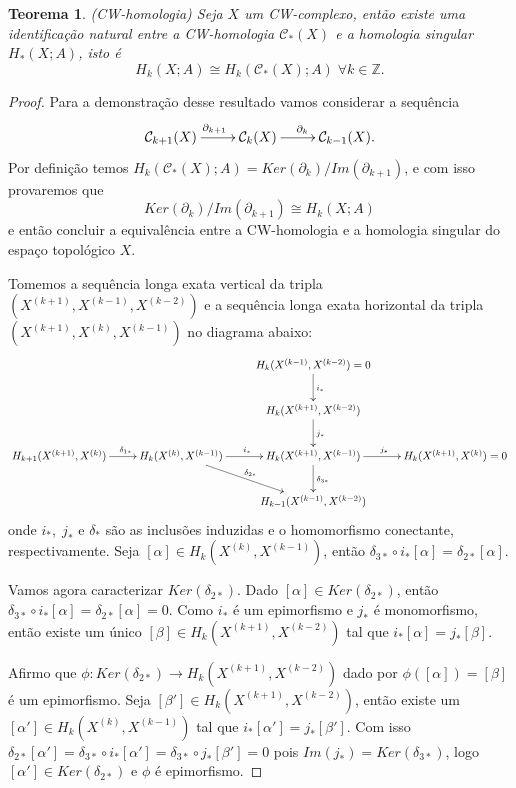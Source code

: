 \documentclass[12pt]{book}
\newtheorem{teorema}{Teorema}[section]
\newcommand{\classe}[1]{[#1]}
\newcommand{\homologia}[2]{H_{#1}(#2;A)}
\newcommand{\homologiarelskele}[3]{H_{#1}(X^{(#2)}, X^{(#3)})}
\newcommand{\homologiarelskelesimpl}[2]{H_{#1}(X^{(#2)}, X^{(#2-1)})}
\newcommand{\inteiros}{\mathbb{Z}}
\newcommand{\skeleton}[1]{X^{(#1)}}
\begin{document}
	\begin{teorema}\label{teorema_cw_homologia}
		(CW-homologia) Seja $X$ um CW-complexo, então existe uma identificação natural entre a CW-homologia $\mathcal{C}_{*}(X)$ e a homologia singular $\homologia{*}{X}$, isto é 
		$$
		\homologia{k}{X} \cong \homologia{k}{\mathcal{C}_{*}(X)}\; \forall k \in \inteiros.
		$$
	\end{teorema}
	\begin{proof}
		Para a demonstração desse resultado vamos considerar a sequência 
		$$
		\xymatrix{
			\mathcal{C}_{k+1}(X) \ar[r]^{\partial_{k+1}} & \mathcal{C}_{k}(X) \ar[r]^{\partial_{k}} & \mathcal{C}_{k-1}(X).
		}
		$$
		Por definição temos $\homologia{k}{\mathcal{C}_{*}(X)} = Ker(\partial_{k})/Im(\partial_{k+1})$, e com isso provaremos que 
		$$
		Ker(\partial_{k})/Im(\partial_{k+1}) \cong \homologia{k}{X}
		$$ 
		e então concluir a equivalência entre a CW-homologia e a homologia singular do espaço topológico $X$.
		
		Tomemos a sequência longa exata vertical da tripla $(\skeleton{k+1}, \skeleton{k-1}, \skeleton{k-2})$ e a sequência longa exata horizontal da tripla $(\skeleton{k+1}, \skeleton{k}, \skeleton{k-1})$  no diagrama abaixo:
		$$
		\xymatrix{
			& & \homologiarelskele{k}{k-1}{k-2}= 0 \ar[d]^{i_{*}} &
			\\
			& & \homologiarelskele{k}{k+1}{k-2} \ar[d]^{j_{*}} &
			\\
			\homologiarelskele{k+1}{k+1}{k} \ar[r]^{\quad\delta_{1*}} &		\homologiarelskele{k}{k}{k-1} \ar[r]^{i_{*}} \ar[rd]^{\delta_{2*}} & \homologiarelskele{k}{k+1}{k-1} \ar[r]^{j_{*}} \ar[d]^{\delta_{3*}} & \homologiarelskele{k}{k+1}{k}=0
			\\
			& & \homologiarelskele{k-1}{k-1}{k-2} &
		}
		$$
		onde $i_{*}, \; j_{*}$ e $\delta_{*}$ são as inclusões induzidas e o homomorfismo conectante, respectivamente. Seja $\classe{\alpha} \in \homologiarelskelesimpl{k}{k}$, então $\delta_{3*}\circ i_{*}\classe{\alpha} = \delta_{2*}\classe{\alpha}$.
		
		Vamos agora caracterizar $Ker(\delta_{2*})$. Dado $[\alpha] \in Ker(\delta_{2*})$, então $\delta_{3*}\circ i_{*}\classe{\alpha} = \delta_{2*}\classe{\alpha} = 0$. Como $i_{*}$ é um epimorfismo e $j_{*}$ é monomorfismo, então existe um único $\classe{\beta} \in \homologiarelskele{k}{k+1}{k-2}$ tal que $i_{*} \classe{\alpha} = j_{*} \classe{\beta}$. 
		
		Afirmo que $\phi: Ker(\delta_{2*}) \to \homologiarelskele{k}{k+1}{k-2}$ dado por $\phi(\classe{\alpha}) = \classe{\beta}$ é um epimorfismo. Seja $\classe{\beta'} \in \homologiarelskele{k}{k+1}{k-2}$, então existe um $\classe{\alpha'} \in \homologiarelskele{k}{k}{k-1}$ tal que $i_{*} \classe{\alpha'} = j_{*} \classe{\beta'}$. Com isso $\delta_{2*}\classe{\alpha'} = \delta_{3*}\circ i_{*}\classe{\alpha'} = \delta_{3*}\circ j_{*}\classe{\beta'} = 0$ pois $Im(j_{*}) = Ker(\delta_{3*})$, logo $\classe{\alpha'} \in Ker(\delta_{2*})$ e $\phi$ é epimorfismo.
		

\end{proof}
\end{document}
